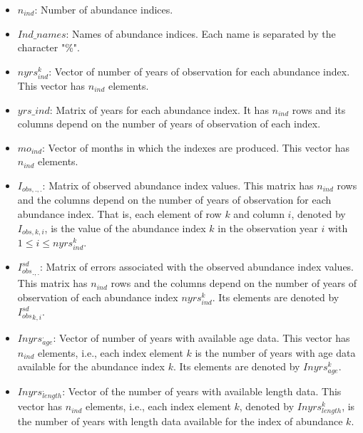 \documentclass{article}
\begin{document}
\begin{itemize}
    \item $n_{ind}$: Number of abundance indices.
    \item $Ind\_names$: Names of abundance indices. Each name is separated by the character "\%".
    \item $nyrs^k_{ind}$: Vector of number of years of observation for each abundance index. This vector has $n_{ind }$ elements.
    \item $yrs\_ind$: Matrix of years for each abundance index. It has $n_{ind}$ rows and its columns depend on the number of years of observation of each index.
    \item $mo_{ind}$: Vector of months in which the indexes are produced. This vector has $n_{ind}$ elements.
    \item $I_{obs,.,.}$: Matrix of observed abundance index values. This matrix has $n_{ind}$ rows and the columns depend on the number of years of observation for each abundance index. That is, each element of row $k$ and column $i$, denoted by $I_{obs,k,i}$, is the value of the abundance index $k$ in the observation year $i$ with $1 \leq  i \leq nyrs^k_{ind}$.
    \item ${I_{obs}^{sd}}_{.,.}$: Matrix of errors associated with the observed abundance index values. This matrix has $n_{ind} $ rows and the columns depend on the number of years of observation of each abundance index $nyrs^k_{ind}$. Its elements are denoted by ${I_{obs}^{sd}}_{k,i}$.
    \item $Inyrs^._{age}$: Vector of number of years with available age data. This vector has $n_{ind}$ elements, i.e., each index element $k$ is the number of years with age data available for the abundance index $k$. Its elements are denoted by $Inyrs^k_{age}$.
    \item $Inyrs^._{length}$: Vector of the number of years with available length data. This vector has $n_{ind}$ elements, i.e., each index element $k$, denoted by $Inyrs^k_{length}$, is the number of years with length data available for the index of abundance $k$.

\end{itemize}
\end{document}
